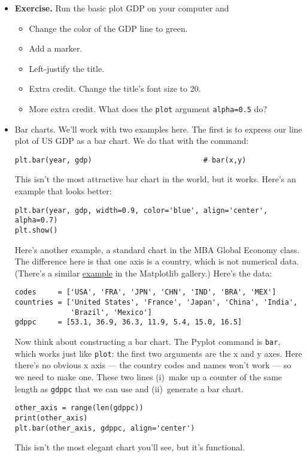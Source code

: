 \documentclass[11pt]{article}
\begin{document}
\begin{itemize}
\item {\bf Exercise.} Run the basic plot GDP on your computer and
\begin{itemize}
\item Change the color of the GDP line to green.
\item Add a marker.
\item Left-justify the title.
\item Extra credit.  Change the title's font size to 20.
\item More extra credit.  What does the {\tt plot} argument {\tt alpha=0.5} do?
\end{itemize}


\item Bar charts.
We'll work with two examples here.
The first is to express our line plot of US GDP as a bar chart.
We do that with the command:
\begin{verbatim}
plt.bar(year, gdp)                          # bar(x,y)
\end{verbatim}
This isn't the most attractive bar chart in the world, but it works.
Here's an example that looks better:
\begin{verbatim}
plt.bar(year, gdp, width=0.9, color='blue', align='center', alpha=0.7)
plt.show()
\end{verbatim}


Here's another example, a standard chart in the MBA Global Economy class.
The difference here is that one axis is a country, which is not numerical data.
(There's a similar
\href{http://matplotlib.org/examples/lines_bars_and_markers/barh_demo.html}{example}
in the Matplotlib gallery.)
Here's the data:
\begin{verbatim}
codes     = ['USA', 'FRA', 'JPN', 'CHN', 'IND', 'BRA', 'MEX']
countries = ['United States', 'France', 'Japan', 'China', 'India',
             'Brazil', 'Mexico']
gdppc     = [53.1, 36.9, 36.3, 11.9, 5.4, 15.0, 16.5]
\end{verbatim}
Now think about constructing a bar chart.
The Pyplot command is {\tt bar},
which works just like {\tt plot}:  the first two arguments
are the x and y axes.
Here there's no obvious x axis --- the country codes and names won't work ---
so we need to make one.
These two lines (i)~make up a counter of the same length as {\tt gdppc}
that we can use
and (ii)~generate a bar chart.
\begin{verbatim}
other_axis = range(len(gdppc))
print(other_axis)
plt.bar(other_axis, gdppc, align='center')
\end{verbatim}
This isn't the most elegant chart you'll see, but it's functional.


\end{itemize}
\end{document}
